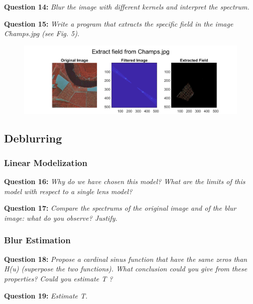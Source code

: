\newpage
\textbf{Question 14:}
\textit{Blur the image with diﬀerent kernels and interpret the spectrum.}



\textbf{Question 15:}
\textit{Write a program that extracts the speciﬁc ﬁeld in the image Champs.jpg (see Fig. 5).}


\begin{figure}[H]
    \centering
    \includegraphics[width=\linewidth]{Doc/Graphics/Part1/Part1_Question15.png}
    \label{fig:enter-label}
\end{figure}


\subsection{Deblurring}
\subsubsection{Linear Modelization}
\textbf{Question 16:}
\textit{Why do we have chosen this model? What are the limits of this model with respect to a single lens model?}

\TODO{}

\textbf{Question 17:}
\textit{Compare the spectrums of the original image and of the blur image: what do you observe? Justify.}

\TODO{}

\subsubsection{Blur Estimation}
\textbf{Question 18:}
\textit{Propose a cardinal sinus function that have the same zeros than H(u) (superpose the two functions). What conclusion could you give from these properties? Could you estimate T ?}

\TODO{}

\textbf{Question 19:}
\textit{Estimate T.}

